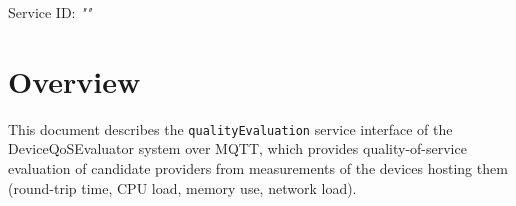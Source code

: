 \documentclass[a4paper]{arrowhead}
\begin{document}
\sloppy

\ArrowheadSetup

\begin{center}
  \vspace*{1cm}
  \huge{\arrowtitle}

  \vspace*{0.2cm}
  \LARGE{\arrowtype}
  \vspace*{1cm}

  \Large{Service ID: \textit{"\arrowid"}}

  \vspace*{\fill}


  \vspace*{1cm}
  \vspace*{\fill}

  \begin{abstract}
    This document describes the MQTT protocol with TLS payload security and JSON payload encoding variant of the \texttt{qualityEvaluation} service of the DeviceQoSEvaluator system.
  \end{abstract}

  \vspace*{1cm}
\end{center}

\newpage

\tableofcontents
\newpage

\section{Overview}
\label{sec:overview}

This document describes the \texttt{qualityEvaluation} service interface of the DeviceQoSEvaluator system over MQTT, which provides quality-of-service evaluation of candidate providers from measurements of the devices hosting them (round-trip time, CPU load, memory use, network load).
\end{document}
